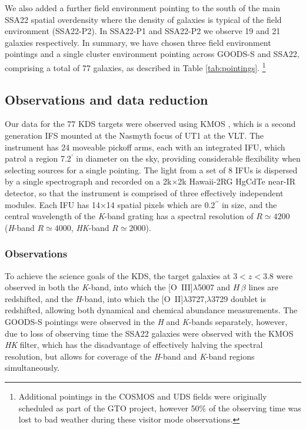 \documentclass[fleqn,usenatbib]{mnras}
\begin{document}
We also added a further field environment pointing to the south of the main SSA22 spatial overdensity where the density of galaxies is typical of the field environment (SSA22-P2).
In SSA22-P1 and SSA22-P2 we observe 19 and 21 galaxies respectively.
In summary, we have chosen three field environment pointings and a single cluster environment pointing across GOODS-S and SSA22, comprising a total of 77 galaxies, as described in Table \ref{tab:pointings}. \footnote{Additional pointings in the COSMOS and UDS fields were originally scheduled as part of the GTO project, however 50$\%$ of the observing time was lost to bad weather during these visitor mode observations.}

\subsection{Observations and data reduction}\label{subsubsec:observations_and_dr}

Our data for the 77 KDS targets were observed using KMOS \citep{Sharples2013}, which is a second generation IFS mounted at the Nasmyth focus of UT1 at the VLT.
The instrument has 24 moveable pickoff arms, each with an integrated IFU, which patrol a region 7.2$^{\prime}$ in diameter on the sky, providing considerable flexibility when selecting sources for a single pointing.
The light from a set of 8 IFUs is dispersed by a single spectrograph and recorded on a 2k$\times$2k Hawaii-2RG HgCdTe near-IR detector, so that the instrument is comprised of three effectively independent modules.
Each IFU has 14$\times$14 spatial pixels which are 0.2$^{\prime\prime}$ in size, and the central wavelength of the {\it K}-band grating has a spectral resolution of $R\simeq4200$ ({\it H}-band $R\simeq4000$, {\it HK}-band $R\simeq2000$).
\subsubsection{Observations}\label{subsubsec:Obs}

To achieve the science goals of the KDS, the target galaxies at $3 < z < 3.8$ were observed in both the {\it K}-band, into which the [O~{\sc III}]$\lambda$5007 and $H\,\beta$ lines are redshifted, and the {\it H}-band, into which the [O~{\sc II}]$\lambda$3727,$\lambda$3729 doublet is redshifted, allowing both dynamical and chemical abundance measurements.
The GOODS-S pointings were observed in the {\it H} and {\it K}-bands separately, however, due to loss of observing time the SSA22 galaxies were observed with the KMOS {\it HK} filter, which has the disadvantage of effectively halving the spectral resolution, but allows for coverage of the {\it H}-band and {\it K}-band regions simultaneously. \\
\end{document}
